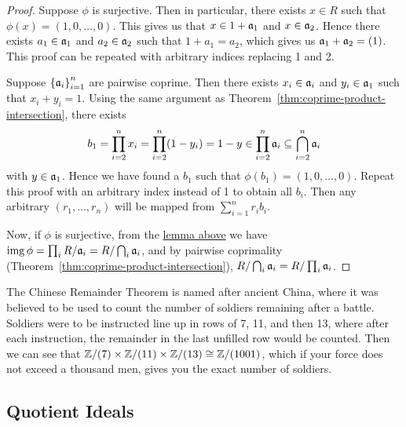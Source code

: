 \begin{proof}
    Suppose \(\phi\) is surjective.
    Then in particular, there exists \(x \in R\)
    such that \(\phi(x) = (1,0,\hdots,0)\).
    This gives us that \(x \in 1 + \mathfrak{a}_1\) and \(x \in \mathfrak{a}_2\).
    Hence there exists \(a_1 \in \mathfrak{a}_1\) and \(a_2 \in \mathfrak{a}_2\)
    such that \(1 + a_1 = a_2\),
    which gives us \(\mathfrak{a}_1 + \mathfrak{a}_2 = (1)\).
    This proof can be repeated with arbitrary indices replacing 1 and 2.

    Suppose \({\{\mathfrak{a}_i\}}_{i=1}^n\) are pairwise coprime.
    Then there exists \(x_i \in \mathfrak{a}_i\) and \(y_i \in \mathfrak{a}_1\)
    such that \(x_i + y_i = 1\).
    Using the same argument as Theorem~\ref{thm:coprime-product-intersection},
    there exists
    \begin{equation*}
        b_1 = \prod_{i=2}^n x_i = \prod_{i=2}^n (1-y_i) = 1 - y
        \in \prod_{i=2}^n \mathfrak{a}_i \subseteq \bigcap_{i=2}^n \mathfrak{a}_i
    \end{equation*}
    with \(y \in \mathfrak{a}_1\).
    Hence we have found a \(b_1\) such that \(\phi(b_1) = (1,0,\hdots,0)\).
    Repeat this proof with an arbitrary index instead of 1 to obtain all \(b_i\).
    Then any arbitrary \((r_1,\hdots,r_n)\)
    will be mapped from \(\sum_{i=1}^n r_i b_i\).

    Now, if \(\phi\) is surjective,
    from the \hyperref[lem:ideal-projections]{lemma above}
    we have \(\operatorname{img}\phi = \prod_i R/\mathfrak{a}_i = R/\bigcap_i \mathfrak{a}_i\),
    and by pairwise coprimality (Theorem~\ref{thm:coprime-product-intersection}),
    \(R/\bigcap_i \mathfrak{a}_i = R/\prod_i \mathfrak{a}_i\).
\end{proof}
\begin{remark}
    The Chinese Remainder Theorem is named after ancient China,
    where it was believed to be used to count the number of soldiers remaining after a battle.
    Soldiers were to be instructed line up in rows of 7, 11, and then 13,
    where after each instruction,
    the remainder in the last unfilled row would be counted.
    Then we can see that \(\mathbb{Z}/(7) \times \mathbb{Z}/(11) \times \mathbb{Z}/(13) \cong \mathbb{Z}/(1001)\),
    which if your force does not exceed a thousand men,
    gives you the exact number of soldiers.
\end{remark}

\subsection*{Quotient Ideals}

